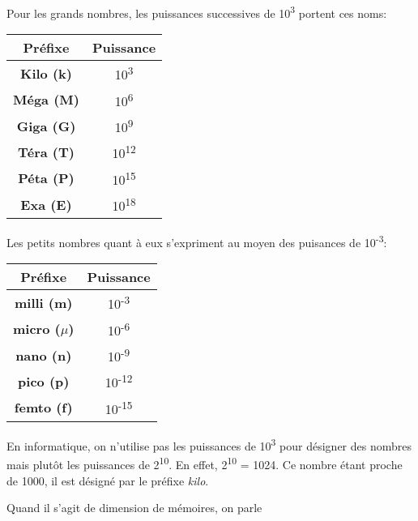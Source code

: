 \documentclass[
  letterpaper,
]{scrbook}
\theoremstyle{definition}
\theoremstyle{definition}
\theoremstyle{remark}
\begin{document}
Pour les grands nombres, les puissances successives de
10\textsuperscript{3} portent ces noms:

\begin{longtable}[]{@{}cc@{}}
\toprule()
\textbf{Préfixe} & \textbf{Puissance} \\
\midrule()
\endhead
\textbf{Kilo (k)} & 10\textsuperscript{3} \\
\textbf{Méga (M)} & 10\textsuperscript{6} \\
\textbf{Giga (G)} & 10\textsuperscript{9} \\
\textbf{Téra (T)} & 10\textsuperscript{12} \\
\textbf{Péta (P)} & 10\textsuperscript{15} \\
\textbf{Exa (E)} & 10\textsuperscript{18} \\
\bottomrule()
\end{longtable}

Les petits nombres quant à eux s'expriment au moyen des puisances de
10\textsuperscript{-3}:

\begin{longtable}[]{@{}cc@{}}
\toprule()
\textbf{Préfixe} & \textbf{Puissance} \\
\midrule()
\endhead
\textbf{milli (m)} & 10\textsuperscript{-3} \\
\textbf{micro (\(\mu\))} & 10\textsuperscript{-6} \\
\textbf{nano (n)} & 10\textsuperscript{-9} \\
\textbf{pico (p)} & 10\textsuperscript{-12} \\
\textbf{femto (f)} & 10\textsuperscript{-15} \\
\bottomrule()
\end{longtable}

En informatique, on n'utilise pas les puissances de
10\textsuperscript{3} pour désigner des nombres mais plutôt les
puissances de 2\textsuperscript{10}. En effet, 2\textsuperscript{10} =
1024. Ce nombre étant proche de 1000, il est désigné par le préfixe
\emph{kilo}.

\begin{tcolorbox}[enhanced jigsaw, arc=.35mm, breakable, rightrule=.15mm, left=2mm, colbacktitle=quarto-callout-note-color!10!white, colframe=quarto-callout-note-color-frame, coltitle=black, titlerule=0mm, leftrule=.75mm, toprule=.15mm, bottomtitle=1mm, opacityback=0, title=\textcolor{quarto-callout-note-color}{\faInfo}\hspace{0.5em}{Note}, toptitle=1mm, bottomrule=.15mm, opacitybacktitle=0.6, colback=white]

Quand il s'agit de dimension de mémoires, on parle

\end{tcolorbox}
\end{document}
